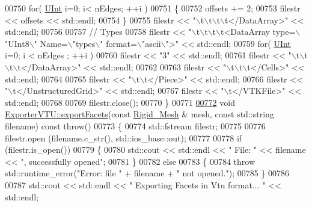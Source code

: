 \begin{DoxyCode}
00750     \textcolor{keywordflow}{for}( \hyperlink{namespaceFVCode3D_a4bf7e328c75d0fd504050d040ebe9eda}{UInt} i=0; i< nEdges; ++i )
00751     \{
00752         offsets += 2;
00753         filestr << offsets << std::endl;
00754     \}
00755     filestr << \textcolor{stringliteral}{"\(\backslash\)t\(\backslash\)t\(\backslash\)t\(\backslash\)t</DataArray>"} << std::endl;
00756 
00757     \textcolor{comment}{//  Types}
00758     filestr << \textcolor{stringliteral}{"\(\backslash\)t\(\backslash\)t\(\backslash\)t\(\backslash\)t<DataArray type=\(\backslash\)"UInt8\(\backslash\)" Name=\(\backslash\)"types\(\backslash\)" format=\(\backslash\)"ascii\(\backslash\)">"} << std::endl;
00759     \textcolor{keywordflow}{for}( \hyperlink{namespaceFVCode3D_a4bf7e328c75d0fd504050d040ebe9eda}{UInt} i=0; i < nEdges ; ++i )
00760         filestr << \textcolor{stringliteral}{"3"} << std::endl;
00761     filestr << \textcolor{stringliteral}{"\(\backslash\)t\(\backslash\)t\(\backslash\)t\(\backslash\)t</DataArray>"} << std::endl;
00762 
00763     filestr << \textcolor{stringliteral}{"\(\backslash\)t\(\backslash\)t\(\backslash\)t</Cells>"} << std::endl;
00764 
00765     filestr << \textcolor{stringliteral}{"\(\backslash\)t\(\backslash\)t</Piece>"} << std::endl;
00766     filestr << \textcolor{stringliteral}{"\(\backslash\)t</UnstructuredGrid>"} << std::endl;
00767     filestr << \textcolor{stringliteral}{"\(\backslash\)t</VTKFile>"} << std::endl;
00768 
00769     filestr.close();
00770 \}
00771 
\hypertarget{ExportVTU_8cpp_source.tex_l00772}{}\hyperlink{classFVCode3D_1_1ExporterVTU_a15e1d2e6940ac0a37bf3c4d0ee5dc4d5}{00772} \textcolor{keywordtype}{void} \hyperlink{classFVCode3D_1_1ExporterVTU_a15e1d2e6940ac0a37bf3c4d0ee5dc4d5}{ExporterVTU::exportFacets}(\textcolor{keyword}{const} \hyperlink{classFVCode3D_1_1Rigid__Mesh}{Rigid\_Mesh} & mesh, \textcolor{keyword}{const} 
      std::string filename) \textcolor{keyword}{const} \textcolor{keywordflow}{throw}()
00773 \{
00774     std::fstream filestr;
00775 
00776     filestr.open (filename.c\_str(), std::ios\_base::out);
00777 
00778     \textcolor{keywordflow}{if} (filestr.is\_open())
00779     \{
00780         std::cout << std::endl << \textcolor{stringliteral}{" File: "} << filename << \textcolor{stringliteral}{", successfully opened"};
00781     \}
00782     \textcolor{keywordflow}{else}
00783     \{
00784         \textcolor{keywordflow}{throw} std::runtime\_error(\textcolor{stringliteral}{"Error: file "} + filename + \textcolor{stringliteral}{" not opened."});
00785     \}
00786 
00787     std::cout << std::endl << \textcolor{stringliteral}{" Exporting Facets in Vtu format... "} << std::endl;

\end{DoxyCode}
